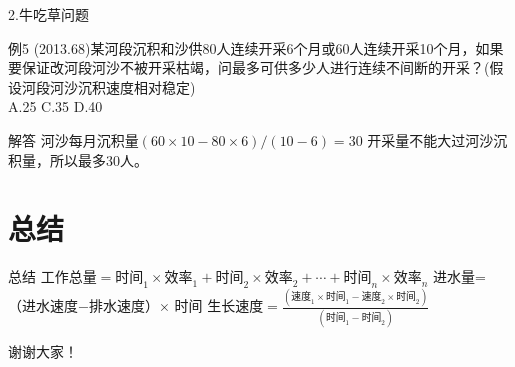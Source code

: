 \documentclass[10pt]{beamer}
\begin{document}
\begin{frame}{2.牛吃草问题}
\begin{block}{例5}
  (2013.68)某河段沉积和沙供80人连续开采6个月或60人连续开采10个月，如果要保证改河段河沙不被开采枯竭，问最多可供多少人进行连续不间断的开采？(假设河段河沙沉积速度相对稳定) \\
   A.25         \quad C.35    \quad  D.40
\end{block}
\begin{alertblock}{解答}
河沙每月沉积量$(60\times 10-80\times 6)/(10-6)=30$
开采量不能大过河沙沉积量，所以最多30人。
\end{alertblock}
\end{frame}
\section{总结}
\begin{frame}{总结}
工作总量$=\mbox{时间}_1\times \mbox{效率}_1+\mbox{时间}_2\times \mbox{效率}_2+\cdots+\mbox{时间}_n\times \mbox{效率}_n$
\newline
\newline
进水量=（进水速度$-$排水速度）$\times$ 时间
\newline
\newline
生长速度$=\frac{(\mbox{速度}_1\times \mbox{时间}_1-\mbox{速度}_2\times \mbox{时间}_2)}{(\mbox{时间}_1-\mbox{时间}_2)}$

\end{frame}



\begin{frame}

\begin{center}

  \Huge{谢谢大家！}
\end{center}

\end{frame}
\end{document}
